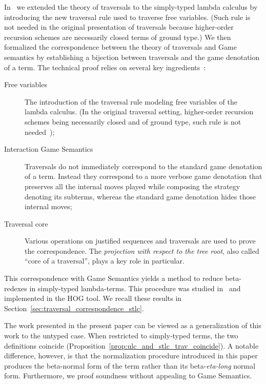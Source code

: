 \documentclass{elsarticle}
\theoremstyle{plain}
\theoremstyle{definition}
\theoremstyle{remark}
\begin{document}
In~\cite{BlumPhd} we extended the theory of traversals to the simply-typed lambda calculus by introducing the new traversal rule  used to traverse free variables. (Such rule is not needed in the original presentation of traversals because higher-order recursion schemes are necessarily closed terms of ground type\cite{Ong2006}.) We then formalized the correspondence between the theory of traversals and Game semantics by establishing a bijection between traversals and the game denotation of a term. The technical proof relies on several key ingredients~\cite{BlumPhd}:
\begin{description}
  \item[Free variables] The introduction of the traversal rule  modeling  free variables of the lambda calculus. (In the original traversal setting, higher-order recursion schemes being necessarily closed and of ground type, such rule is not needed~\cite{Ong2006});
  \item[Interaction Game Semantics] Traversals do not immediately correspond to the standard game denotation of a term. Instead they correspond to a more verbose game denotation that preserves all the internal moves played while composing the strategy denoting its subterms, whereas the standard game denotation hides those internal moves;
  \item[Traversal core] Various operations on justified sequences and traversals are used to prove the correspondence. The \emph{projection with respect to the tree root}, also called  ``core of a traversal'', plays a key role in particular.
\end{description}

 This correspondence with Game Semantics yields a method to reduce beta-redexes in simply-typed lambda-terms. This procedure was studied in~\cite{BlumPhd,BlumGalop2008,Blum-HogTool,Ong-NormByTrav2015} and implemented in the HOG tool\cite{BlumGalop2008, BlumPhd}. We recall these results in Section~\ref{sec:traversal_correspondence_stlc}.

The work presented in the present paper can be viewed as a generalization of this work to the untyped case. When restricted to simply-typed terms, the two definitions coincide (Proposition~\ref{prop:ulc_and_stlc_trav_coincide}).
A notable difference, however, is that the normalization procedure introduced in this paper produces the beta-normal form of the term rather than its beta-\emph{eta-long} normal form. Furthermore, we proof soundness without appealing to Game Semantics.
\end{document}
